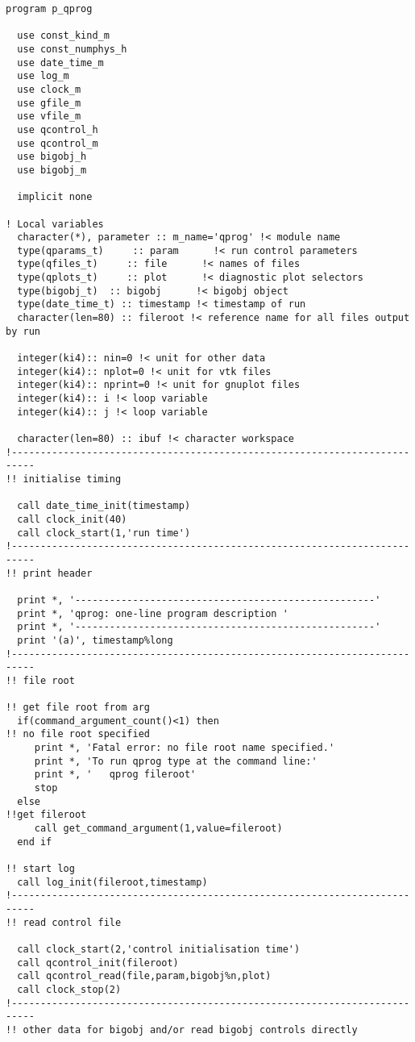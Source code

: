 \small
\begin{verbatim}
program p_qprog

  use const_kind_m
  use const_numphys_h
  use date_time_m
  use log_m
  use clock_m
  use gfile_m
  use vfile_m
  use qcontrol_h
  use qcontrol_m
  use bigobj_h
  use bigobj_m

  implicit none

! Local variables
  character(*), parameter :: m_name='qprog' !< module name
  type(qparams_t)     :: param      !< run control parameters
  type(qfiles_t)     :: file      !< names of files
  type(qplots_t)     :: plot      !< diagnostic plot selectors
  type(bigobj_t)  :: bigobj      !< bigobj object
  type(date_time_t) :: timestamp !< timestamp of run
  character(len=80) :: fileroot !< reference name for all files output by run

  integer(ki4):: nin=0 !< unit for other data
  integer(ki4):: nplot=0 !< unit for vtk files
  integer(ki4):: nprint=0 !< unit for gnuplot files
  integer(ki4):: i !< loop variable
  integer(ki4):: j !< loop variable

  character(len=80) :: ibuf !< character workspace
!--------------------------------------------------------------------------
!! initialise timing

  call date_time_init(timestamp)
  call clock_init(40)
  call clock_start(1,'run time')
!--------------------------------------------------------------------------
!! print header

  print *, '----------------------------------------------------'
  print *, 'qprog: one-line program description '
  print *, '----------------------------------------------------'
  print '(a)', timestamp%long
!--------------------------------------------------------------------------
!! file root

!! get file root from arg
  if(command_argument_count()<1) then
!! no file root specified
     print *, 'Fatal error: no file root name specified.'
     print *, 'To run qprog type at the command line:'
     print *, '   qprog fileroot'
     stop
  else
!!get fileroot
     call get_command_argument(1,value=fileroot)
  end if

!! start log
  call log_init(fileroot,timestamp)
!--------------------------------------------------------------------------
!! read control file

  call clock_start(2,'control initialisation time')
  call qcontrol_init(fileroot)
  call qcontrol_read(file,param,bigobj%n,plot)
  call clock_stop(2)
!--------------------------------------------------------------------------
!! other data for bigobj and/or read bigobj controls directly


\end{verbatim}
